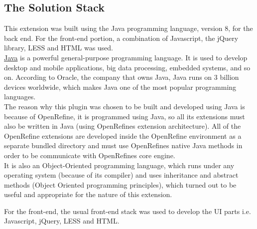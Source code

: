 \subsection{The Solution Stack}
This extension was built using the Java programming language, version 8, for the back end. For the front-end portion,
a combination of Javascript, the jQuery library, LESS and HTML was used. \\
\newline
\href{https://www.java.com/en/}{Java} is a powerful general-purpose programming language.
It is used to develop desktop and mobile applications,
big data processing, embedded systems, and so on.
According to Oracle, the company that owns Java, Java runs on 3 billion devices worldwide, which makes Java one of the
most popular programming languages.~\cite{WhatIsJava}\\
\newline
The reason why this plugin was chosen to be built and developed using Java is
because of OpenRefine, it is programmed using Java,
so all its extensions must also be written in Java (using OpenRefine\textquotesingle s extension
architecture). All of the OpenRefine extensions are developed inside the
OpenRefine environment as a separate bundled directory and must use OpenRefine\textquotesingle s
native Java methods in order to be communicate with OpenRefine\textquotesingle s core engine.\\
It is also an Object-Oriented programming language, which runs under any operating system
(because of its compiler) and uses inheritance and abstract methods (Object Oriented programming principles),
which turned out to be useful and appropriate for the nature of this extension.\\
\newline

For the front-end, the usual front-end stack was used to develop the UI parts i.e. Javascript, jQuery, LESS and HTML.
\pagebreak
